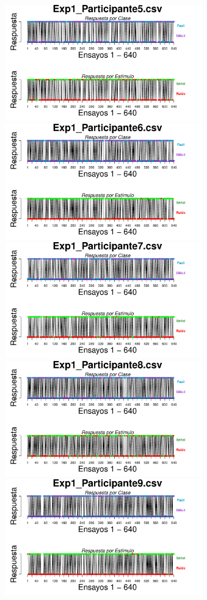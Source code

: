 \documentclass[a4paper ]{article}
\begin{document}
\begin{figure}[th]
\includegraphics[width=9cm, height=5cm]{Figures/BiasResp_Exp1_P5} \includegraphics[width=9cm, height=5cm]{Figures/BiasResp_Exp1_P6}
\includegraphics[width=9cm, height=5cm]{Figures/BiasResp_Exp1_P7} \includegraphics[width=9cm, height=5cm]{Figures/BiasResp_Exp1_P8} 
\includegraphics[width=9cm, height=5cm]{Figures/BiasResp_Exp1_P9}
\end{figure}
\end{document}
